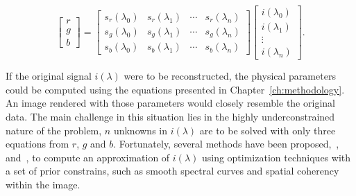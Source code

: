 \begin{equation}
\begin{bmatrix}
r \\
g \\
b
\end{bmatrix}
= 
\begin{bmatrix}
s_r(\lambda_0) & s_r(\lambda_1) & \cdots & s_r(\lambda_n) \\
s_g(\lambda_0) & s_g(\lambda_1) & \cdots & s_g(\lambda_n) \\
s_b(\lambda_0) & s_b(\lambda_1) & \cdots & s_b(\lambda_n) 
\end{bmatrix}
\begin{bmatrix}
i(\lambda_0) \\
i(\lambda_1) \\
\vdots \\
i(\lambda_n) 
\end{bmatrix}.
\label{eq:spectrum_collapse_disc}
\end{equation}

If the original signal $i(\lambda)$ were to be reconstructed, the physical parameters could be computed using the equations presented in Chapter~\ref{ch:methodology}.
An image rendered with those parameters would closely resemble the original data.
The main challenge in this situation lies in the highly underconstrained nature of the problem, $n$ unknowns in $i(\lambda)$ are to be solved with only three equations from $r$, $g$ and $b$.
Fortunately, several methods have been proposed,~\cite{Smits:1999},~\cite{Sun2001} and~\cite{Drew:2003}, to compute an approximation of $i(\lambda)$ using optimization techniques with a set of prior constrains, such as smooth spectral curves and spatial coherency within the image.

